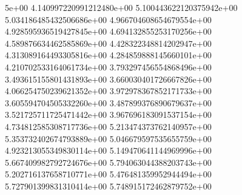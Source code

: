 5e+00	4.140997220991212480e+00	5.100443622120375942e+00	5.034186485432506686e+00	4.966704608654679554e+00	4.928595936519427845e+00	4.694132855253170256e+00	4.589876634462585869e+00	4.428322348814202947e+00	4.313089164493305816e+00	4.284859888145660101e+00	4.210702533164061734e+00	3.793297456554868496e+00	3.493615155801431893e+00	3.660030401726667826e+00	4.066254750239621352e+00	3.972978367852171733e+00	3.605594704505332260e+00	3.487899376890679637e+00	3.521725711725471442e+00	3.967696183091537154e+00	4.734812585308717736e+00	5.213474373762140957e+00	5.353732402674793889e+00	5.046679597535655759e+00	4.923213055349830114e+00	5.149470641144969996e+00	5.667409982792724676e+00	5.794063044388203743e+00	5.202716137658710771e+00	5.476481359952944494e+00	5.727901399831310414e+00	5.748915172462879752e+00
